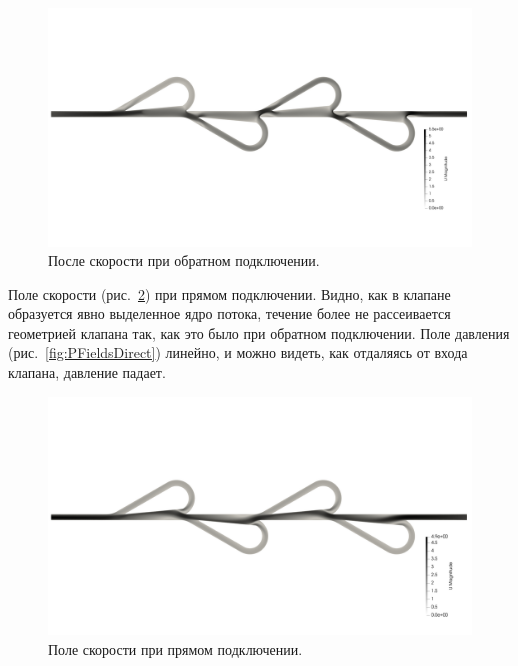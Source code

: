 \documentclass[14pt,a4paper]{article}
\begin{document}
        \begin{figure}[H]
            \centering
            \includegraphics[width = 1\linewidth]{UFieldsReverse}
            \caption{После скорости при обратном подключении.}
            \label{fig:UFieldsReverse}
        \end{figure}
        
        Поле скорости (рис.~\ref{fig:UFieldsDirect}) при прямом подключении. Видно, как в клапане образуется явно выделенное ядро потока, течение более не рассеивается геометрией клапана так, как это было при обратном подключении. Поле давления (рис.~\ref{fig:PFieldsDirect}) линейно, и можно видеть, как отдаляясь от входа клапана, давление падает.
        
        \begin{figure}[H]
            \centering
            \includegraphics[width = 1\linewidth]{UFieldsDirect}
            \caption{Поле скорости при прямом подключении.}
            \label{fig:UFieldsDirect}
        \end{figure}
        
\end{document}
